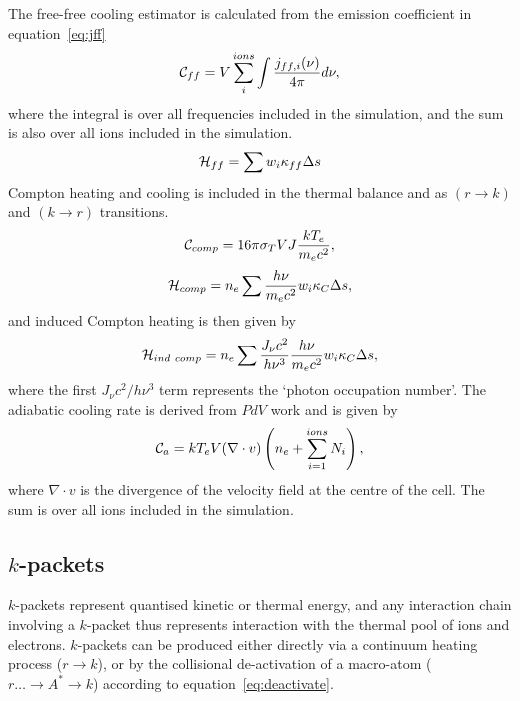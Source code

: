 The free-free cooling estimator is calculated from the emission coefficient
in equation~\ref{eq:jff} 
\begin{equation}
{\cal C}_{ff} = V \sum_i^{ions} \int \frac{j_{ff,i}(\nu)}{4\pi} d\nu,
\end{equation}
where the integral is over all frequencies included in the simulation,
and the sum is also over all ions included in the simulation.
\begin{equation}
{\cal H}_{ff} = \sum w_i \kappa_{ff} \Delta s
\end{equation}
Compton heating and cooling is included in the thermal balance and as
$(r\rightarrow k)$ and $(k\rightarrow r)$ transitions.
\begin{equation}
{\cal C}_{comp} = 16 \pi \sigma_T V J \frac{k T_e}{m_e c^2},
\end{equation}
\begin{equation}
{\cal H}_{comp} = n_e \sum \frac{h\nu}{m_e c^2} w_i \kappa_{C}\Delta s,
\end{equation}
and induced Compton heating is then given by \citep{cloudy2013}
\begin{equation}
{\cal H}_{ind~comp} = n_e \sum \frac{J_\nu c^2}{h \nu^3} \frac{h\nu}{m_e c^2} 
w_i \kappa_{C} \Delta s,
\end{equation}
where the first $J_\nu c^2/h \nu^3$ term represents the `photon occupation number'.
The adiabatic cooling rate is derived from $PdV$ work and is given by
\begin{equation}
{\cal C}_{a} = k T_e V (\nabla \cdot v) \left(n_e + \sum\limits_{i=1}^{ions} N_i\right),
\end{equation}
where $\nabla \cdot v$ is the divergence of the 
velocity field at the centre of the cell. The sum is over all ions 
included in the simulation.

\noindent

\subsection{$k$-packets}
$k$-packets represent quantised kinetic or thermal energy, and any interaction
chain involving a $k$-packet thus represents interaction with the thermal
pool of ions and electrons. $k$-packets can be produced either directly
via a continuum heating process ($r \rightarrow k$), 
or by the collisional de-activation of a macro-atom 
($r \ldots \rightarrow A^* \rightarrow k$) according to equation~\ref{eq:deactivate}. 

